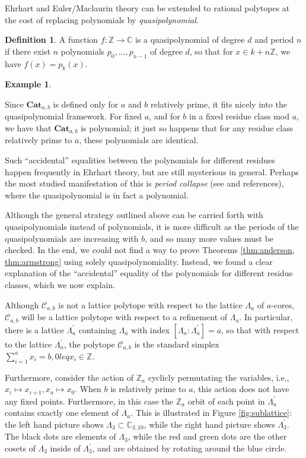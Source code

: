 \documentclass{amsart}[12pt]
\theoremstyle{definition}
\newtheorem{example}[dummy]{Example}
\newtheorem{definition}[dummy]{Definition}
\newcommand{\Z}{\mathbb{Z}}
\newcommand{\C}{\mathbb{C}}
\newcommand{\Cat}{\mathbf{Cat}}
\begin{document}
Ehrhart and Euler/Maclaurin theory can be extended to rational polytopes at the cost of replacing polynomials by \emph{quasipolynomial}.  

\begin{definition}
A function $f:\Z\to\C$ is a quasipolynomial of degree $d$ and period $n$ if there exist $n$ polynomials $p_0,\dots, p_{n-1}$ of degree $d$, so that for $x\in k+n\Z$, we have $f(x)=p_k(x)$.
\end{definition}

\begin{example}

\end{example}


Since $\Cat_{a,b}$ is defined only for $a$ and $b$ relatively prime, it fits nicely into the quasipolynomial framework.  For fixed $a$, and for $b$ in a fixed residue class mod $a$, we have that $\Cat_{a,b}$ is polynomial; it just so happens that for any residue class relatively prime to $a$, these polynomials are identical.

Such ``accidental'' equalities between the polynomials for different residues happen frequently in Ehrhart theory, but are still mysterious in general.  Perhaps the most studied manifestation of this is \emph{period collapse} (see \cite{Haase} and references), where the quasipolynomial is in fact a polynomial.


Although the general strategy outlined above can be carried forth with quasipolynomials instead of polynomials, it is more difficult as the periods of the quasipolynomials are increasing with $b$, and so many more values must be checked.  In the end, we could not find a way to prove Theorems \ref{thm:anderson, thm:armstrong} using solely quasipolynomiality.   Instead, we found a clear explanation of the ``accidental'' equality of the polynomials for different residue classes, which we now explain.

Although $\mathcal{C}_{a,b}$ is not a lattice polytope with respect to the lattice $\Lambda_a$ of $a$-cores, $\mathcal{C}_{a,b}$ will be a lattice polytope with respect to a refinement of $\Lambda_a$.  In particular, there is a lattice $\Lambda_a^\prime$ containing $\Lambda_a$ with index $[\Lambda_a:\Lambda^\prime_a]=a$, so that with respect to the lattice $\Lambda_a^\prime$, the polytope $\mathcal{C}_{a,b}$ is the standard simplex $\sum_{i=1}^{a} x_i=b, 0
leq x_i\in \Z$.  

Furthermore, consider the action of $\Z_a$ cyclicly permutating the variables, i.e., $x_i\mapsto x_{i+1}, x_{a}\mapsto x_0$.   When $b$ is relatively prime to $a$, this action does not have any fixed points.  Furthermore, in this case the $\Z_a$ orbit of each point in $\Lambda_a^\prime$ contains exactly one element of $\Lambda_a$.  This is illustrated in Figure \ref{fig:sublattice}: the left hand picture shows $\Lambda_3\subset \C_{3,10}$, while the right hand picture shows $\Lambda_3^\prime$.  The black dots are elements of $\Lambda_3$, while the red and green dots are the other cosets of $\Lambda_3$ inside of $\Lambda_3^\prime$, and are obtained by rotating around the blue circle.
\end{document}
